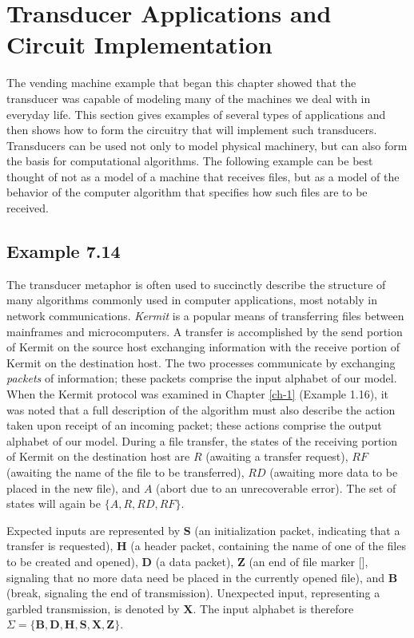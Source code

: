 \section{Transducer Applications and Circuit Implementation}\label{sec-7.4}

The vending machine example that began this chapter showed that the transducer
was capable of modeling many of the machines we deal with in everyday life. This
section gives examples of several types of applications and then shows how to
form the circuitry that will implement such transducers. Transducers can be used
not only to model physical machinery, but can also form the basis for
computational algorithms. The following example can be best thought of not as a
model of a machine that receives files, but as a model of the behavior of the
computer algorithm that specifies how such files are to be received.

\subsection*{Example 7.14}

The transducer metaphor is often used to succinctly describe the structure of
many algorithms commonly used in computer applications, most notably in network
communications. \emph{Kermit} is a popular means of transferring files
between mainframes and microcomputers. A transfer is accomplished by the send
portion of Kermit on the source host exchanging information with the receive
portion of Kermit on the destination host. The two processes communicate by
exchanging \emph{packets} of information; these packets comprise the input
alphabet of our model. When the Kermit protocol was examined in Chapter \ref{ch-1}
(Example 1.16), it was noted that a full description of the algorithm must also
describe the action taken upon receipt of an incoming packet; these actions
comprise the output alphabet of our model. During a file transfer, the states of
the receiving portion of Kermit on the destination host are $R$ (awaiting a
transfer request), $RF$ (awaiting the name of the file to be transferred),
$RD$ (awaiting more data to be placed in the new file), and $A$ (abort due to an
unrecoverable error). The set of states will again be $\{A,R,RD,RF\}$.

Expected inputs are represented by  $\pmb{S}$ (an initialization packet, indicating
that a transfer is requested), $\pmb{H}$ (a header packet, containing the name of
one of the files to be created and opened), $\pmb{D}$ (a data packet), $\pmb{Z}$ (an
end of file marker [], signaling that no more data need be placed in the currently
opened file), and $\pmb{B}$ (break, signaling the end of transmission). Unexpected
input, representing a garbled transmission, is denoted by $\pmb{X}$. The input
alphabet is therefore $\Sigma=\{\pmb{B},\pmb{D},\pmb{H},\pmb{S},\pmb{X},
\pmb{Z}\}$.

